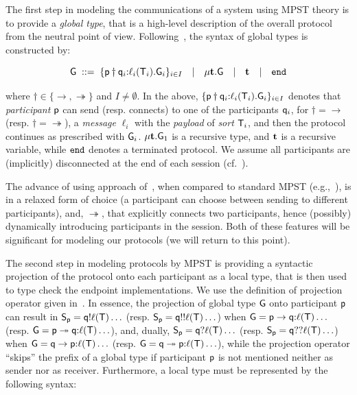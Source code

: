 The first step in modeling the communications of a system using MPST theory 
is to provide a \emph{global type}, that is a high-level description of the overall protocol from the neutral 
point of view. 
Following~\cite{HuY17}, the syntax of global types is constructed by:

\begin{equation}
	{\sf G} \; ::= \;
	\{{\sf p}\dagger{\sf q}_i{:}\ell_i({\mathsf T}_i).{\sf G}_i\}_{i\in I}  \quad | \quad 
	\mu \textbf{t}.{\sf G} \quad | \quad 
	\textbf{t} \quad | \quad
	\mathtt{end}
\end{equation}

where $\dagger\in\{\to, \twoheadrightarrow\}$ and $I\not=\emptyset$. 
In the above, $\{{\sf p}\dagger{\sf q}_i{:}\ell_i({\mathsf T}_i).{\sf G}_i\}_{i\in I}$
denotes that \emph{participant} ${\sf p}$ can send (resp. connects) to one of the participants ${\sf q}_i$, 
for $\dagger=\to$ (resp. $\dagger=\twoheadrightarrow$), 
a \emph{message} $\ell_i$ with the \emph{payload} of \emph{sort} ${\mathsf T}_i$, 
and then the protocol continues as prescribed with ${\sf G}_i$.  
$\mu \textbf{t}.{\sf G}_1$ is a recursive type, and $\textbf{t}$ is a recursive variable, 
while $\mathtt{end}$ denotes a terminated protocol. We assume all participants are (implicitly) disconnected at the end of each session (cf.~\cite{HuY17}). 

The advance of using approach of~\cite{HuY17}, when compared to standard MPST (e.g.,~\cite{HondaYC08}),
is in a relaxed form of choice (a participant can choose between sending to different participants), 
and, $\twoheadrightarrow$, that explicitly connects two participants, hence (possibly) dynamically 
introducing participants in the session.
Both of these features will be significant for modeling our protocols (we will return to this point).

The second step in modeling protocols by MPST is providing a syntactic projection of the protocol onto each participant as a local type, that is then used to
type check the endpoint implementations.  
We use the definition of projection operator given in~\cite[Figure \ref{fig:fig2}]{HuY17}. 
In essence, the projection of global type ${\sf G}$ onto participant ${\sf p}$ can result in 
${\mathsf S}_{\sf p}={\sf q}{!}\ell({\mathsf T})\ldots$ (resp. ${\mathsf S}_{\sf p}={\sf q}{!!}\ell({\mathsf T})\ldots$) 
when ${\sf G}={\sf p}\to{\sf q}{:}\ell({\mathsf T})\ldots$ (resp. ${\sf G}={\sf p}\twoheadrightarrow{\sf q}{:}\ell({\mathsf T})\ldots$), 
and, dually, ${\mathsf S}_{\sf p}={\sf q}{?}\ell({\mathsf T})\ldots$ (resp. ${\mathsf S}_{\sf p}={\sf q}{??}\ell({\mathsf T})\ldots$) when ${\sf G}={\sf q}\to{\sf p}{:}\ell({\mathsf T})\ldots$ 
(resp. ${\sf G}={\sf q}\twoheadrightarrow{\sf p}{:}\ell({\mathsf T})\ldots$), 
while the projection operator ``skips'' the prefix of a global type if participant ${\sf p}$ is not mentioned neither as sender nor as receiver. Furthermore, a local type must be represented by the following syntax:


